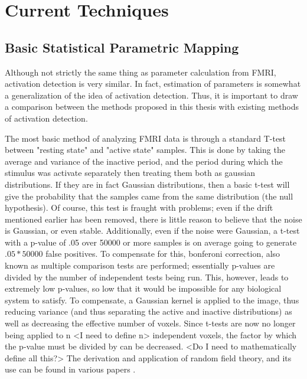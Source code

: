\documentclass{article}
\begin{document}
\section{Current Techniques}
\subsection{Basic Statistical Parametric Mapping}
Although not strictly the same thing as parameter calculation from 
FMRI, activation detection is very similar. In fact, estimation of 
parameters is somewhat a generalization of the idea of activation detection.
Thus, it is important to draw a comparison between the methods proposed
in this thesis with existing methods of activation detection.

The most basic method of analyzing FMRI data is through a standard T-test
between "resting state" and "active state" samples. This is done by 
taking the average and variance of the inactive period, and the 
period during which the stimulus was activate separately then treating 
them both as gaussian distributions.
If they are in fact Gaussian distributions, then a basic t-test will
give the probability that the samples came from the same distribution
(the null hypothesis). Of course, this test is fraught with problems; even if
the drift mentioned earlier has been removed, there is little reason
to believe that the noise is Gaussian, or even stable. Additionally, 
even if the noise were Gaussian, a t-test with a p-value of .05 over
50000 or more samples is on average going to generate $.05*50000$ false
positives. To compensate for this, bonferoni correction, also known as
multiple comparison tests are performed; essentially p-values are 
divided by the number of independent
tests being run. This, however, leads to extremely low p-values, so
low that it would be impossible for any biological system to satisfy. To
compensate, a Gaussian kernel is applied to the image, thus reducing
variance (and thus separating the active and inactive distributions)
as well as decreasing the effective number of voxels. Since t-tests are
now no longer being applied to n <I need to define n> independent voxels,
the factor by which the p-value must be divided by can be decreased.
<Do I need to mathematically define all this?> The derivation and application
of random field theory, and its use can be found in various papers \cite{univ_mult_rft}.
\end{document}
